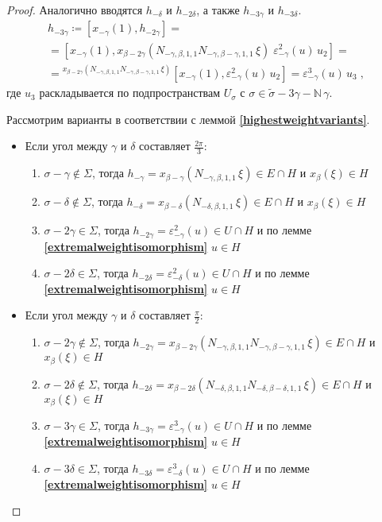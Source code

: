\documentclass[12pt]{matmex-diploma}
\theoremstyle{mystyleni}
\theoremstyle{mystyle}
\newcommand\refb[1]{\textbf{\ref{#1}}}
\newcommand{\N}{\mathbb{N}}
\begin{document}
\begin{proof}
Аналогично вводятся $h_{-\delta}$ и $h_{-2\delta}$, а также $h_{-3\gamma}$ и $h_{-3\delta}$.
\begin{multline*}
h_{-3\gamma} \coloneqq [x_{-\gamma}(1),h_{-2\gamma}] = \\ =
[x_{-\gamma}(1), x_{\beta-2\gamma}(N_{-\gamma,\beta,1,1} N_{-\gamma,\beta-\gamma,1,1} \, \xi) \; \varepsilon^2_{-\gamma}(u) \, u_2] = \\ =
{}^{x_{\beta-2\gamma}(N_{-\gamma,\beta,1,1} N_{-\gamma,\beta-\gamma,1,1} \, \xi)}[x_{-\gamma}(1),\varepsilon^2_{-\gamma}(u) \, u_2] =
\varepsilon^3_{-\gamma}(u) \, u_3
 \; ,
\end{multline*}
где $u_3$ раскладывается по подпространствам $U_\sigma$ с $\sigma \in \widetilde\sigma-3\gamma - \N \, \gamma$.

Рассмотрим варианты в соответствии с леммой \refb{highestweightvariants}.
\begin{itemize}[label={\LARGE\raisebox{-0.4ex}{\textbullet}\;},leftmargin=2\parindent]
\item Если угол между $\gamma$ и $\delta$ составляет $\frac{2\pi}{3}$:
\begin{enumerate}
\item $ \sigma - \gamma \notin \Sigma$, тогда $h_{-\gamma}=x_{\beta-\gamma}(N_{-\gamma,\beta,1,1} \,\xi)\in E\cap H$ и $x_\beta(\xi)\in H$
\item $ \sigma - \delta \notin \Sigma$, тогда $h_{-\delta}=x_{\beta-\delta}(N_{-\delta,\beta,1,1} \,\xi)\in E\cap H$ и $x_\beta(\xi)\in H$
\item $ \sigma - 2\gamma \in \Sigma$, тогда $h_{-2\gamma}=\varepsilon_{-\gamma}^2(u)\in U\cap H$ и по лемме \refb{extremalweightisomorphism} $u\in H$
\item $ \sigma - 2\delta \in \Sigma$, тогда $h_{-2\delta}=\varepsilon_{-\delta}^2(u)\in U\cap H$ и по лемме \refb{extremalweightisomorphism} $u\in H$
\end{enumerate}
\item Если угол между $\gamma$ и $\delta$ составляет $\frac{\pi}{2}$:
\begin{enumerate}
\item $ \sigma - 2\gamma \notin \Sigma$, тогда $h_{-2\gamma}=x_{\beta-2\gamma}(N_{-\gamma,\beta,1,1}N_{-\gamma,\beta-\gamma,1,1} \,\xi)\in E\cap H$ и $x_\beta(\xi)\in H$
\item $ \sigma - 2\delta \notin \Sigma$, тогда $h_{-2\delta}=x_{\beta-2\delta}(N_{-\delta,\beta,1,1}N_{-\delta,\beta-\delta,1,1} \,\xi)\in E\cap H$ и $x_\beta(\xi)\in H$
\item $ \sigma - 3\gamma \in \Sigma$, тогда $h_{-3\gamma}=\varepsilon_{-\gamma}^3(u)\in U\cap H$ и по лемме \refb{extremalweightisomorphism} $u\in H$
\item $ \sigma - 3\delta \in \Sigma$, тогда $h_{-3\delta}=\varepsilon_{-\delta}^3(u)\in U\cap H$ и по лемме \refb{extremalweightisomorphism} $u\in H$
\end{enumerate}
\end{itemize}


\end{proof}
\end{document}
